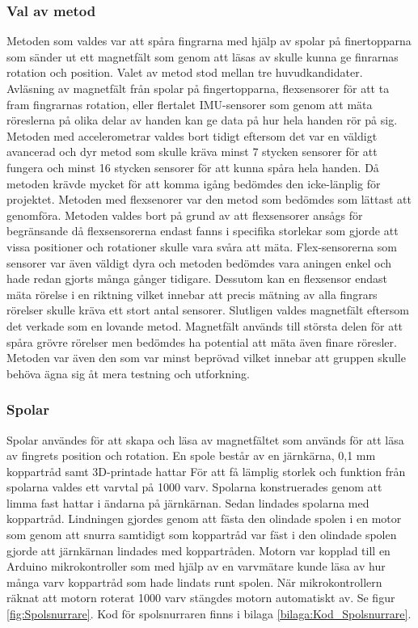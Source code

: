 \documentclass[a4paper]{article}
\begin{document}
\begin{sloppypar}
  \subsubsection{Val av metod}
  Metoden som valdes var att spåra fingrarna med hjälp av spolar på finertopparna som
  sänder ut ett magnetfält som genom att läsas av skulle kunna ge finrarnas rotation
  och position. Valet av metod stod mellan tre huvudkandidater. Avläsning av magnetfält
  från spolar på fingertopparna, flexsensorer för att ta fram fingrarnas rotation, eller
  flertalet IMU-sensorer som genom att mäta röreslerna på olika delar av handen kan
  ge data på hur hela handen rör på sig.
  Metoden med accelerometrar valdes bort tidigt eftersom det var en väldigt avancerad och
  dyr metod som skulle kräva minst 7 stycken sensorer för att fungera och minst 16 stycken
  sensorer för att kunna spåra hela handen. Då metoden krävde mycket för att komma
  igång bedömdes den icke-länplig för projektet.
  Metoden med flexsenorer var den metod som bedömdes som lättast att genomföra. Metoden
  valdes bort på grund av att flexsensorer ansågs för begränsande då flexsensorerna
  endast fanns i specifika storlekar som gjorde att vissa positioner och rotationer
  skulle vara svåra att mäta. Flex-sensorerna som sensorer var även väldigt dyra och
  metoden bedömdes vara aningen enkel och hade redan gjorts många gånger tidigare.
  Dessutom kan en flexsensor endast mäta rörelse i en riktning vilket innebar att
  precis mätning av alla fingrars rörelser skulle kräva ett stort antal sensorer.
  Slutligen valdes magnetfält eftersom det verkade som en lovande metod. Magnetfält
  används till största delen för att spåra grövre rörelser men bedömdes ha potential
  att mäta även finare röresler. Metoden var även den som var minst beprövad vilket
  innebar att gruppen skulle behöva ägna sig åt mera testning och utforkning.




  \subsubsection{Spolar}
  Spolar användes för att skapa och läsa av magnetfältet som används för att läsa av fingrets position och rotation.
  En spole består av en järnkärna, 0,1 mm koppartråd samt 3D-printade hattar
  För att få lämplig storlek och funktion från spolarna valdes ett varvtal på 1000 varv.
  Spolarna konstruerades genom att limma fast hattar i ändarna på järnkärnan.
  Sedan lindades spolarna med koppartråd.
  Lindningen gjordes genom att fästa den olindade spolen i en motor som genom att snurra samtidigt som koppartråd
  var fäst i den olindade spolen gjorde att järnkärnan lindades med koppartråden.
  Motorn var kopplad till en Arduino mikrokontroller som med hjälp av en varvmätare kunde läsa av hur många varv
  koppartråd som hade lindats runt spolen.
  När mikrokontrollern räknat att motorn roterat 1000 varv stängdes motorn automatiskt av. Se figur \ref{fig:Spolsnurrare}.
  Kod för spolsnurraren finns i bilaga \ref{bilaga:Kod_Spolsnurrare}.


\end{sloppypar}
\end{document}
